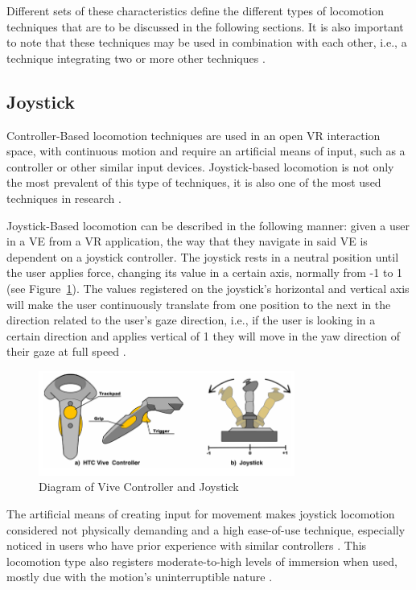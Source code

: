 Different sets of these characteristics define the different types of 
locomotion techniques that are to be discussed in the following sections. 
It is also important to note that these techniques may be used in combination with each other, 
i.e., a technique integrating two or more other techniques \cite{Boletsis2022}.

\subsection{Joystick}
\label{sec:joystick}

Controller-Based locomotion techniques are used in an open \gls{VR} interaction space, with continuous motion and require 
an artificial means of input, such as a controller or other similar input devices\cite{Boletsis2017}.
Joystick-based locomotion is not only the most prevalent of this type of techniques, it is also one of the most used 
techniques in research \cite{Boletsis2022}.

Joystick-Based locomotion can be described in the following manner: given a user in a \gls{VE} from a \gls{VR} application, 
the way that they navigate in said \gls{VE} is dependent on a joystick controller. The joystick rests in a neutral position until the user
applies force, changing its value in a certain axis, normally from -1 to 1 (see Figure~\ref{fig:vive-joystick}). The values registered 
on the joystick's horizontal and vertical axis will make the user continuously translate from one position to the next in the 
direction related to the user's gaze direction, i.e., if the user is looking in a certain direction and applies vertical of 1 
they will move in the yaw direction of their gaze at full speed \cite{Coomer2018}.
\begin{figure}[b]
    \centering
    \includegraphics[width=0.75\textwidth]{NOVAthesisFiles/Images/papers/vive-joystick.png}
    \caption{Diagram of Vive Controller and Joystick \cite{Coomer2018}}
    \label{fig:vive-joystick}
\end{figure}

The artificial means of creating input for movement makes joystick locomotion considered not physically demanding and a high ease-of-use 
technique, especially noticed in users who have prior experience with similar controllers \cite{Nasiri2023}. This locomotion type also registers 
moderate-to-high levels of immersion when used, mostly due with the motion's uninterruptible nature \cite{Boletsis2019}.

